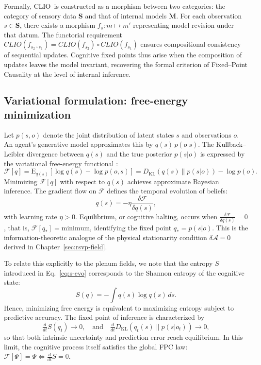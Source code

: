 \documentclass[12pt,a4paper]{article}
\newcommand{\CLIO}{CLIO}              %
\newcommand{\action}{\mathcal{A}}     %
\newcommand{\ddt}{\tfrac{d}{dt}}      %
\newcommand{\State}{\Psi}             %
\newcommand{\F}{\mathcal{F}}          %
\theoremstyle{plain}
\begin{document}
Formally, \CLIO\ is constructed as a morphism between two categories: the category of sensory data \(\mathbf{S}\) and that of internal models \(\mathbf{M}\).
For each observation \(s \in \mathbf{S}\), there exists a morphism
\(f_s : m \mapsto m'\)
representing model revision under that datum.
The functorial requirement \(\CLIO(f_{s_2\!\circ s_1}) = \CLIO(f_{s_2}) \circ \CLIO(f_{s_1})\)
ensures compositional consistency of sequential updates.
Cognitive fixed points thus arise when the composition of updates leaves the model invariant, 
recovering the formal criterion of Fixed--Point Causality at the level of internal inference.

\subsection{Variational formulation: free-energy minimization}
Let \(p(s,o)\) denote the joint distribution of latent states \(s\) and observations \(o\).
An agent’s generative model approximates this by \(q(s)\,p(o|s)\).
The Kullback–Leibler divergence between \(q(s)\) and the true posterior \(p(s|o)\)
is expressed by the variational free-energy functional \citep{friston2023active,friston2025beautiful}:
\begin{equation}
\mathcal{F}[q] = 
  \mathrm{E}_{q(s)}[\log q(s) - \log p(o,s)] 
  = D_{\mathrm{KL}}(q(s)\|p(s|o)) - \log p(o).
\end{equation}
Minimizing \(\mathcal{F}[q]\) with respect to \(q(s)\)
achieves approximate Bayesian inference.
The gradient flow on \(\mathcal{F}\) defines the temporal evolution of beliefs:
\begin{equation}
\dot{q}(s)
  = -\eta \frac{\delta \mathcal{F}}{\delta q(s)},
\end{equation}
with learning rate \(\eta > 0\).
Equilibrium, or cognitive halting, occurs when
\(\frac{\delta \mathcal{F}}{\delta q(s)} = 0\),
that is,
\(\mathcal{F}[q_*] = \text{minimum}\),
identifying the fixed point \(q_* = p(s|o)\).
This is the information-theoretic analogue of the physical stationarity condition
\(\delta\action = 0\) derived in Chapter~\ref{sec:rsvp-field}.  

To relate this explicitly to the plenum fields, we note that the entropy \(S\) introduced in Eq.~\eqref{eq:s-evo}
corresponds to the Shannon entropy of the cognitive state:
\begin{equation}
S(q) = -\int q(s)\log q(s)\, ds.
\end{equation}
Hence, minimizing free energy is equivalent to maximizing entropy subject to predictive accuracy.
The fixed point of inference is characterized by
\[
\ddt S(q_t) \rightarrow 0 ,
\quad\text{and}\quad
\ddt D_{\mathrm{KL}}(q_t(s)\|p(s|o_t)) \rightarrow 0,
\]
so that both intrinsic uncertainty and prediction error reach equilibrium.
In this limit, the cognitive process itself satisfies the global FPC law:
\(\F[\State] = \State \iff \ddt S = 0\).
\end{document}
